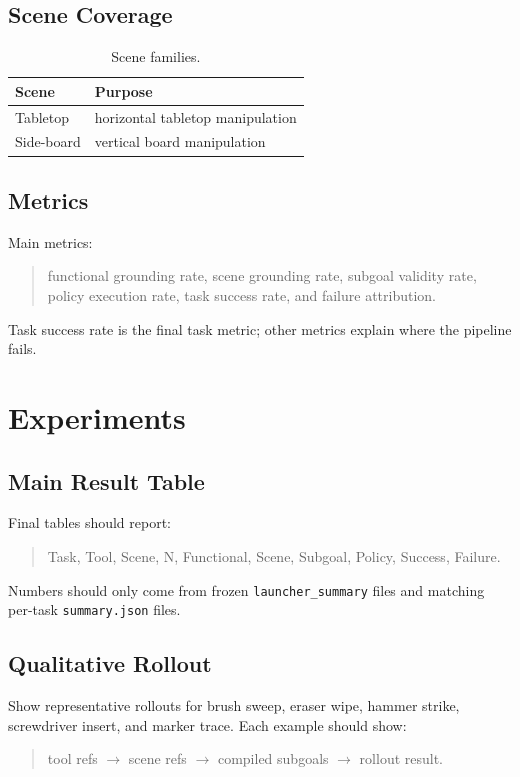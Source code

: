 \documentclass[journal]{IEEEtran}
\begin{document}
\subsection{Scene Coverage}
\begin{table}[h]
\centering
\caption{Scene families.}
\begin{tabular}{ll}
\toprule
Scene & Purpose \\
\midrule
Tabletop & horizontal tabletop manipulation \\
Side-board & vertical board manipulation \\
\bottomrule
\end{tabular}
\end{table}

\subsection{Metrics}
Main metrics:
\begin{quote}
functional grounding rate, scene grounding rate, subgoal validity rate, policy
execution rate, task success rate, and failure attribution.
\end{quote}
Task success rate is the final task metric; other metrics explain where the
pipeline fails.

\section{Experiments}
\subsection{Main Result Table}
Final tables should report:
\begin{quote}
Task, Tool, Scene, N, Functional, Scene, Subgoal, Policy, Success, Failure.
\end{quote}
Numbers should only come from frozen \texttt{launcher\_summary} files and
matching per-task \texttt{summary.json} files.

\subsection{Qualitative Rollout}
Show representative rollouts for brush sweep, eraser wipe, hammer strike,
screwdriver insert, and marker trace. Each example should show:
\begin{quote}
tool refs $\rightarrow$ scene refs $\rightarrow$ compiled subgoals
$\rightarrow$ rollout result.
\end{quote}
\end{document}
